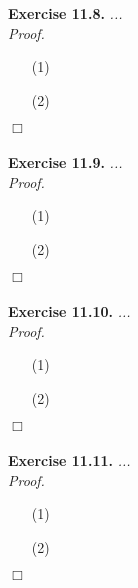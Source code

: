 \documentclass{article}
\begin{document}



\textbf{Exercise 11.8.}
\emph{...} \\

\emph{Proof.}
\begin{enumerate}
\item[(1)]
\item[(2)]

\end{enumerate}
$\Box$ \\\\






\textbf{Exercise 11.9.}
\emph{...} \\

\emph{Proof.}
\begin{enumerate}
\item[(1)]
\item[(2)]

\end{enumerate}
$\Box$ \\\\






\textbf{Exercise 11.10.}
\emph{...} \\

\emph{Proof.}
\begin{enumerate}
\item[(1)]
\item[(2)]

\end{enumerate}
$\Box$ \\\\






\textbf{Exercise 11.11.}
\emph{...} \\

\emph{Proof.}
\begin{enumerate}
\item[(1)]
\item[(2)]

\end{enumerate}
$\Box$ \\\\
\end{document}
